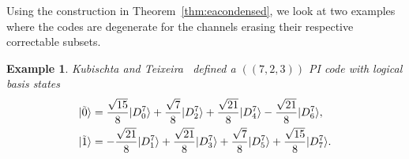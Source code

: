\documentclass[]{amsart}
\DeclarePairedDelimiter\ket{\lvert}{\rangle}
\newtheorem{example}[theorem]{Example}
\begin{document}
Using the construction in Theorem~\ref{thm:eacondensed}, we look at two examples where the codes are degenerate for the channels erasing their respective correctable subsets.

\begin{example}\label{ex:eapi7}
    Kubischta and Teixeira~\cite{KT2023} defined a $\left(\!\left(7,2,3\right)\!\right)$ PI code with logical basis states
    \begin{align*}
        \ket{\tilde{0}} & = \frac{\sqrt{15}}{8}\ket{D_0^7}+\frac{\sqrt{7}}{8}\ket{D_2^7}+\frac{\sqrt{21}}{8}\ket{D_4^7}-\frac{\sqrt{21}}{8}\ket{D_6^7}, \\
        \ket{\tilde{1}} & = -\frac{\sqrt{21}}{8}\ket{D_1^7}+\frac{\sqrt{21}}{8}\ket{D_3^7}+\frac{\sqrt{7}}{8}\ket{D_5^7}+\frac{\sqrt{15}}{8}\ket{D_7^7}.
    \end{align*}
    

\end{example}
\end{document}
